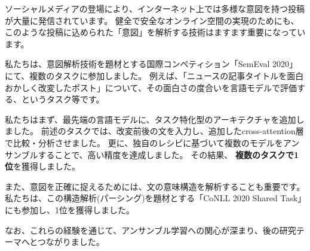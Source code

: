 ソーシャルメディアの登場により、インターネット上では多様な意図を持つ投稿が大量に発信されています。
健全で安全なオンライン空間の実現のためにも、このような投稿に込められた「意図」を解析する技術はますます重要になっています。

私たちは、意図解析技術を題材とする国際コンペティション「SemEval 2020」にて、複数のタスクに参加しました。
例えば、「ニュースの記事タイトルを面白おかしく改変したポスト」について、その面白さの度合いを言語モデルで評価する、というタスク等です。

私たちはまず、最先端の言語モデルに、タスク特化型のアーキテクチャを追加しました。
前述のタスクでは、改変前後の文を入力し、追加したcross-attention層で比較・分析させました。
更に、独自のレシピに基づいて複数のモデルをアンサンブルすることで、高い精度を達成しました。
その結果、 \textbf{複数のタスクで1位}を獲得しました。

また、意図を正確に捉えるためには、文の意味構造を解析することも重要です。
私たちは、この構造解析(パーシング)を題材とする「CoNLL 2020 Shared Task」にも参加し、1位を獲得しました。

なお、これらの経験を通じて、アンサンブル学習への関心が深まり、後の研究テーマへとつながりました。
